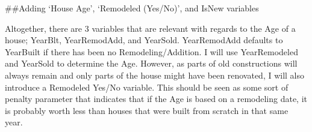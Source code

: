 \documentclass[]{article}
\newenvironment{Shaded}{\begin{snugshade}}{\end{snugshade}}
\newcommand{\CommentTok}[1]{\textcolor[rgb]{0.56,0.35,0.01}{\textit{#1}}}
\newcommand{\DataTypeTok}[1]{\textcolor[rgb]{0.13,0.29,0.53}{#1}}
\newcommand{\DecValTok}[1]{\textcolor[rgb]{0.00,0.00,0.81}{#1}}
\newcommand{\KeywordTok}[1]{\textcolor[rgb]{0.13,0.29,0.53}{\textbf{#1}}}
\newcommand{\NormalTok}[1]{#1}
\newcommand{\OperatorTok}[1]{\textcolor[rgb]{0.81,0.36,0.00}{\textbf{#1}}}
\newcommand{\OtherTok}[1]{\textcolor[rgb]{0.56,0.35,0.01}{#1}}
\newcommand{\StringTok}[1]{\textcolor[rgb]{0.31,0.60,0.02}{#1}}
\begin{document}
\#\#Adding `House Age', `Remodeled (Yes/No)', and IsNew variables

Altogether, there are 3 variables that are relevant with regards to the
Age of a house; YearBlt, YearRemodAdd, and YearSold. YearRemodAdd
defaults to YearBuilt if there has been no Remodeling/Addition. I will
use YearRemodeled and YearSold to determine the Age. However, as parts
of old constructions will always remain and only parts of the house
might have been renovated, I will also introduce a Remodeled Yes/No
variable. This should be seen as some sort of penalty parameter that
indicates that if the Age is based on a remodeling date, it is probably
worth less than houses that were built from scratch in that same year.

\begin{Shaded}
\end{Shaded}

\begin{Shaded}
\end{Shaded}
\end{document}
